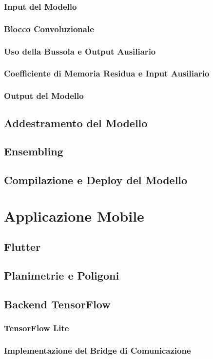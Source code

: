 \documentclass[12pt]{report}
\begin{document}
\subsection{Input del Modello}
\subsection{Blocco Convoluzionale}
\subsection{Uso della Bussola e Output Ausiliario}
\subsection{Coefficiente di Memoria Residua e Input Ausiliario}
\subsection{Output del Modello}
\section{Addestramento del Modello}
\section{Ensembling}
\section{Compilazione e Deploy del Modello}

\chapter{Applicazione Mobile}
\section{Flutter}
\section{Planimetrie e Poligoni}
\section{Backend TensorFlow}
\subsection{TensorFlow Lite}
\subsection{Implementazione del Bridge di Comunicazione}
\end{document}
